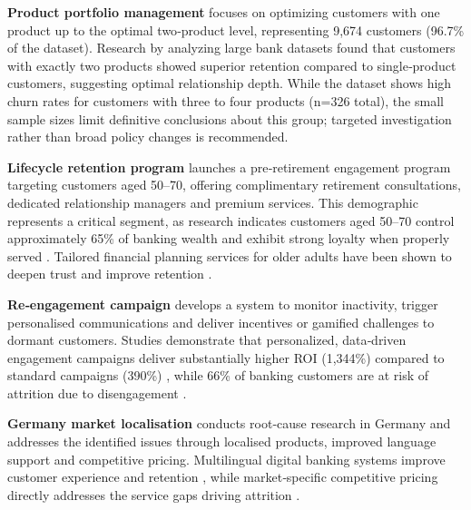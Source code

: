 \documentclass[12pt]{article}
\begin{document}
\textbf{Product portfolio management} focuses on optimizing customers with one product up to the optimal two‑product level, representing 9,674 customers (96.7\% of the dataset).  Research by \citet{singh2024productchurn} analyzing large bank datasets found that customers with exactly two products showed superior retention compared to single‑product customers, suggesting optimal relationship depth.  While the dataset shows high churn rates for customers with three to four products (n=326 total), the small sample sizes limit definitive conclusions about this group; targeted investigation rather than broad policy changes is recommended.

\textbf{Lifecycle retention program} launches a pre‑retirement engagement program targeting customers aged 50–70, offering complimentary retirement consultations, dedicated relationship managers and premium services.  This demographic represents a critical segment, as research indicates customers aged 50–70 control approximately 65\% of banking wealth and exhibit strong loyalty when properly served \citep{marr2024aging}.  Tailored financial planning services for older adults have been shown to deepen trust and improve retention \citep{ncrc2021agefriendly}.

\textbf{Re‑engagement campaign} develops a system to monitor inactivity, trigger personalised communications and deliver incentives or gamified challenges to dormant customers.  Studies demonstrate that personalized, data‑driven engagement campaigns deliver substantially higher ROI (1,344\%) compared to standard campaigns (390\%) \citep{cline2024churn}, while 66\% of banking customers are at risk of attrition due to disengagement \citep{cornerstone2025dormant}.

\textbf{Germany market localisation} conducts root‑cause research in Germany and addresses the identified issues through localised products, improved language support and competitive pricing.  Multilingual digital banking systems improve customer experience and retention \citep{hunsicker2023multilingual}, while market‑specific competitive pricing directly addresses the service gaps driving attrition \citep{smith2025switching}.
\end{document}
